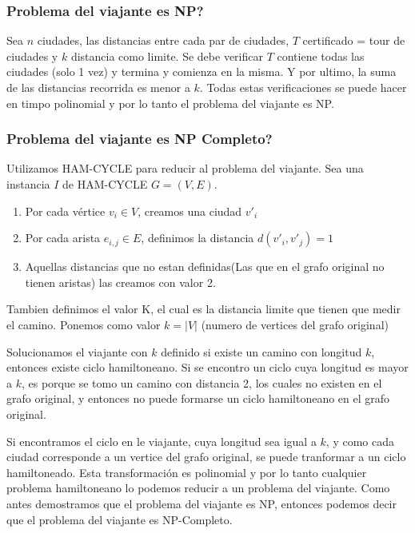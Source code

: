 \documentclass{article}
\begin{document}
\subsubsection{Problema del viajante es NP?}

Sea \(n\) ciudades, las distancias entre cada par de ciudades, \(T\) certificado = tour de ciudades y \(k\)
distancia como limite. Se debe verificar \(T\) contiene todas las ciudades (solo 1 vez) y termina y comienza en la misma. 
Y por ultimo, la suma de las distancias recorrida es menor a \(k\). Todas estas verificaciones se puede hacer en timpo polinomial
y por lo tanto el problema del viajante es NP.

\subsubsection{Problema del viajante es NP Completo?}

Utilizamos HAM-CYCLE para reducir al problema del viajante. Sea una instancia \(I\) de HAM-CYCLE \(G=(V,E)\).

\begin{enumerate}
    \item Por cada vértice \(v_i \in V\), creamos una ciudad \(v'_i\)
    \item Por cada arista \(e_{i,j} \in E\), definimos la distancia \(d(v'_i, v'_j)=1\)
    \item Aquellas distancias que no estan definidas(Las que en el grafo original no tienen aristas) las 
    creamos con valor 2. 
\end{enumerate}

Tambien definimos el valor K, el cual es la distancia limite que tienen que medir el camino. 
Ponemos como valor \(k=|V|\) (numero de vertices del grafo original)

Solucionamos el viajante con \(k\) definido si existe un camino con longitud \(k\), entonces existe ciclo hamiltoneano.
Si se encontro un ciclo cuya longitud es mayor a \(k\), es porque se tomo un camino con distancia 2, los cuales no existen 
en el grafo original, y entonces no puede formarse un ciclo hamiltoneano en el grafo original.

Si encontramos el ciclo en le viajante, cuya longitud sea igual a \(k\), y como cada ciudad corresponde a un 
vertice del grafo original, se puede tranformar a un ciclo hamiltoneado. Esta transformación es polinomial y 
por lo tanto cualquier problema hamiltoneano lo podemos reducir a un problema del viajante. 
Como antes demostramos que el problema del viajante es NP, entonces podemos decir que el problema del viajante
es NP-Completo.
\end{document}
